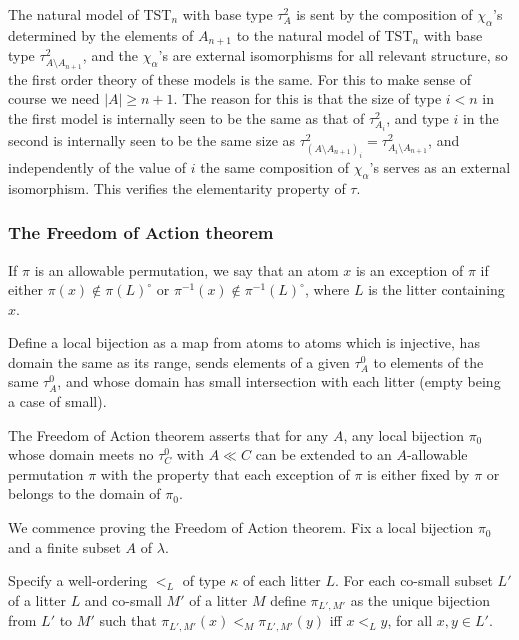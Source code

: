 \documentclass[12pt]{article}
\begin{document}
The natural model of TST$_n$ with base type $\tau^2_A$ is sent by the composition of $\chi_\alpha$'s determined by the elements of $A_{n+1}$
to the natural model of TST$_n$ with base type $\tau^2_{A \setminus A_{n+1}}$, and the $\chi_\alpha$'s are external isomorphisms for all relevant structure, so the first order theory of these models is the same.  For this to make sense of course we need $|A| \geq n+1$.
The reason for this is that the size of type $i<n$ in the first model is internally seen to be the same as that of $\tau^2_{A_i}$, and type $i$ in the  second is internally seen to be the same size
as  $\tau^2_{(A \setminus A_{n+1})_i} = \tau^2_{A_i \setminus A_{n+1}}$, and independently of the value of $i$ the same composition of $\chi_\alpha$'s serves as an external isomorphism.
This verifies the elementarity property of $\tau$.

\newpage

\subsubsection{The Freedom of Action theorem}

If $\pi$ is an allowable permutation, we say that an atom $x$ is
an exception of $\pi$ if either $\pi(x) \not\in \pi(L)^{\circ}$ or $\pi^{-1}(x) \not\in \pi^{-1}(L)^\circ$, where $L$ is the litter containing $x$.

Define a local bijection as a map from atoms to atoms which is injective, has domain the same as its range,  sends elements of a given $\tau^0_A$ to elements of the same
$\tau^0_A$, and whose domain has small intersection with each litter (empty being a case of small).



The Freedom of Action theorem asserts that for any $A$, any local bijection $\pi_0$ whose domain meets no $\tau^0_C$ with $A \ll C$ can be extended to an $A$-allowable permutation $\pi$ with the property that each exception of $\pi$ is either
fixed by $\pi$ or belongs to the domain of $\pi_0$.

We commence proving the Freedom of Action theorem.  Fix a local bijection $\pi_0$ and a finite subset $A$ of $\lambda$. 

Specify a well-ordering $<_L$ of type $\kappa$ of each litter $L$.  For each co-small subset $L'$ of a litter $L$ and co-small $M'$ of a litter $M$ define $\pi_{L',M'}$ as
the unique bijection from $L'$ to $M'$ such that $\pi_{L',M'}(x) <_M \pi_{L',M'}(y)$ iff $x <_L y$, for all $x,y \in L'$.  
\end{document}
